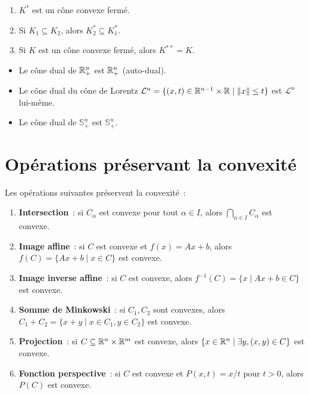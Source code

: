 \begin{proposition}
\label{prop:cone_dual}
\begin{enumerate}
    \item $K^*$ est un c\^one convexe ferm\'e.
    \item Si $K_1 \subseteq K_2$, alors $K_2^* \subseteq K_1^*$.
    \item Si $K$ est un c\^one convexe ferm\'e, alors $K^{**} = K$.
\end{enumerate}
\end{proposition}

\begin{exemple}
\begin{itemize}
    \item Le c\^one dual de $\mathbb{R}^n_+$ est $\mathbb{R}^n_+$ (auto-dual).
    \item Le c\^one dual du c\^one de Lorentz
    $\mathcal{L}^n = \{(x,t) \in \mathbb{R}^{n-1} \times \mathbb{R} \mid \left\| x \right\| \leq t\}$
    est $\mathcal{L}^n$ lui-m\^eme.
    \item Le c\^one dual de $\mathbb{S}^n_+$ est $\mathbb{S}^n_+$.
\end{itemize}
\end{exemple}

\section{Op\'erations pr\'eservant la convexit\'e}

\begin{theoreme}
\label{thm:operations}
Les op\'erations suivantes pr\'eservent la convexit\'e~:
\begin{enumerate}
    \item \textbf{Intersection}~: si $C_\alpha$ est convexe pour tout $\alpha \in I$,
          alors $\bigcap_{\alpha \in I} C_\alpha$ est convexe.
    \item \textbf{Image affine}~: si $C$ est convexe et $f(x) = Ax + b$, alors
          $f(C) = \{Ax + b \mid x \in C\}$ est convexe.
    \item \textbf{Image inverse affine}~: si $C$ est convexe, alors
          $f^{-1}(C) = \{x \mid Ax + b \in C\}$ est convexe.
    \item \textbf{Somme de Minkowski}~: si $C_1, C_2$ sont convexes, alors
          $C_1 + C_2 = \{x + y \mid x \in C_1, y \in C_2\}$ est convexe.
    \item \textbf{Projection}~: si $C \subseteq \mathbb{R}^n \times \mathbb{R}^m$ est convexe, alors
          $\{x \in \mathbb{R}^n \mid \exists y, (x,y) \in C\}$ est convexe.
    \item \textbf{Fonction perspective}~: si $C$ est convexe et $P(x,t) = x/t$ pour
          $t > 0$, alors $P(C)$ est convexe.
\end{enumerate}
\end{theoreme}

